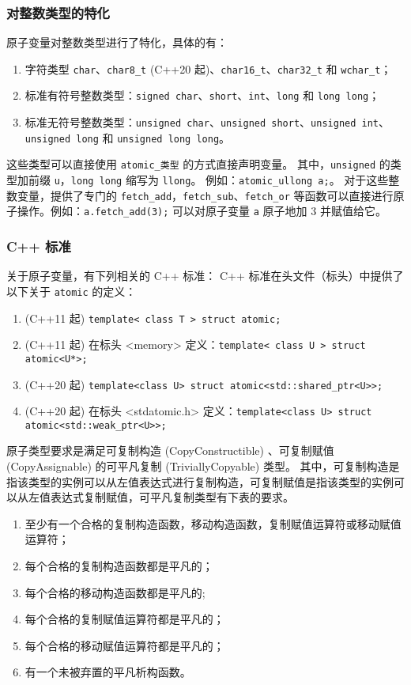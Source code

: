\subsubsection{对整数类型的特化}
原子变量对整数类型进行了特化，具体的有：
\begin{enumerate}
\item 字符类型 \verb`char`、\verb`char8_t` (C++20 起)、\verb`char16_t`、\verb`char32_t` 和 \verb`wchar_t`；
\item 标准有符号整数类型：\verb`signed char`、\verb`short`、\verb`int`、\verb`long` 和 \verb`long long`；
\item 标准无符号整数类型：\verb`unsigned char`、\verb`unsigned short`、\verb`unsigned int`、\verb`unsigned long` 和 \verb`unsigned long long`。
\end{enumerate}
这些类型可以直接使用 \verb`atomic_类型` 的方式直接声明变量。
其中，\verb`unsigned` 的类型加前缀 \verb`u`，\verb`long long` 缩写为 \verb`llong`。
例如：\verb`atomic_ullong a;`。
对于这些整数变量，提供了专门的 \verb`fetch_add`，\verb`fetch_sub`、\verb`fetch_or` 等函数可以直接进行原子操作。例如：\verb`a.fetch_add(3);` 可以对原子变量 \verb`a` 原子地加 $3$ 并赋值给它。

\subsubsection{C++ 标准}
关于原子变量，有下列相关的 C++ 标准：
C++ 标准在头文件（标头）中提供了以下关于 \verb`atomic` 的定义：
\begin{enumerate}
\item (C++11 起) \verb`template< class T > struct atomic;`
\item (C++11 起) 在标头 <memory> 定义：\verb`template< class U > struct atomic<U*>;`
\item (C++20 起) \verb`template<class U> struct atomic<std::shared_ptr<U>>;`
\item (C++20 起) 在标头 <stdatomic.h> 定义：\verb`template<class U> struct atomic<std::weak_ptr<U>>;`
\end{enumerate}

原子类型要求是满足可复制构造 (CopyConstructible) 、可复制赋值 (CopyAssignable) 的可平凡复制 (TriviallyCopyable) 类型。
其中，可复制构造是指该类型的实例可以从左值表达式进行复制构造，可复制赋值是指该类型的实例可以从左值表达式复制赋值，可平凡复制类型有下表的要求。
\begin{enumerate}
\item 至少有一个合格的复制构造函数，移动构造函数，复制赋值运算符或移动赋值运算符；
\item 每个合格的复制构造函数都是平凡的；
\item 每个合格的移动构造函数都是平凡的;
\item 每个合格的复制赋值运算符都是平凡的；
\item 每个合格的移动赋值运算符都是平凡的；
\item 有一个未被弃置的平凡析构函数。
\end{enumerate}